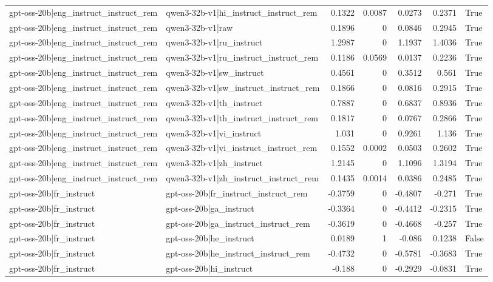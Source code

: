 \begin{table}
\begin{tabular}{l l r r r r l}
gpt-oss-20b|eng_instruct_instruct_rem & qwen3-32b-v1|hi_instruct_instruct_rem & 0.1322 & 0.0087 & 0.0273 & 0.2371 & True \\
gpt-oss-20b|eng_instruct_instruct_rem & qwen3-32b-v1|raw & 0.1896 & 0 & 0.0846 & 0.2945 & True \\
gpt-oss-20b|eng_instruct_instruct_rem & qwen3-32b-v1|ru_instruct & 1.2987 & 0 & 1.1937 & 1.4036 & True \\
gpt-oss-20b|eng_instruct_instruct_rem & qwen3-32b-v1|ru_instruct_instruct_rem & 0.1186 & 0.0569 & 0.0137 & 0.2236 & True \\
gpt-oss-20b|eng_instruct_instruct_rem & qwen3-32b-v1|sw_instruct & 0.4561 & 0 & 0.3512 & 0.561 & True \\
gpt-oss-20b|eng_instruct_instruct_rem & qwen3-32b-v1|sw_instruct_instruct_rem & 0.1866 & 0 & 0.0816 & 0.2915 & True \\
gpt-oss-20b|eng_instruct_instruct_rem & qwen3-32b-v1|th_instruct & 0.7887 & 0 & 0.6837 & 0.8936 & True \\
gpt-oss-20b|eng_instruct_instruct_rem & qwen3-32b-v1|th_instruct_instruct_rem & 0.1817 & 0 & 0.0767 & 0.2866 & True \\
gpt-oss-20b|eng_instruct_instruct_rem & qwen3-32b-v1|vi_instruct & 1.031 & 0 & 0.9261 & 1.136 & True \\
gpt-oss-20b|eng_instruct_instruct_rem & qwen3-32b-v1|vi_instruct_instruct_rem & 0.1552 & 0.0002 & 0.0503 & 0.2602 & True \\
gpt-oss-20b|eng_instruct_instruct_rem & qwen3-32b-v1|zh_instruct & 1.2145 & 0 & 1.1096 & 1.3194 & True \\
gpt-oss-20b|eng_instruct_instruct_rem & qwen3-32b-v1|zh_instruct_instruct_rem & 0.1435 & 0.0014 & 0.0386 & 0.2485 & True \\
gpt-oss-20b|fr_instruct & gpt-oss-20b|fr_instruct_instruct_rem & -0.3759 & 0 & -0.4807 & -0.271 & True \\
gpt-oss-20b|fr_instruct & gpt-oss-20b|ga_instruct & -0.3364 & 0 & -0.4412 & -0.2315 & True \\
gpt-oss-20b|fr_instruct & gpt-oss-20b|ga_instruct_instruct_rem & -0.3619 & 0 & -0.4668 & -0.257 & True \\
gpt-oss-20b|fr_instruct & gpt-oss-20b|he_instruct & 0.0189 & 1 & -0.086 & 0.1238 & False \\
gpt-oss-20b|fr_instruct & gpt-oss-20b|he_instruct_instruct_rem & -0.4732 & 0 & -0.5781 & -0.3683 & True \\
gpt-oss-20b|fr_instruct & gpt-oss-20b|hi_instruct & -0.188 & 0 & -0.2929 & -0.0831 & True \\

\end{tabular}
\end{table}
